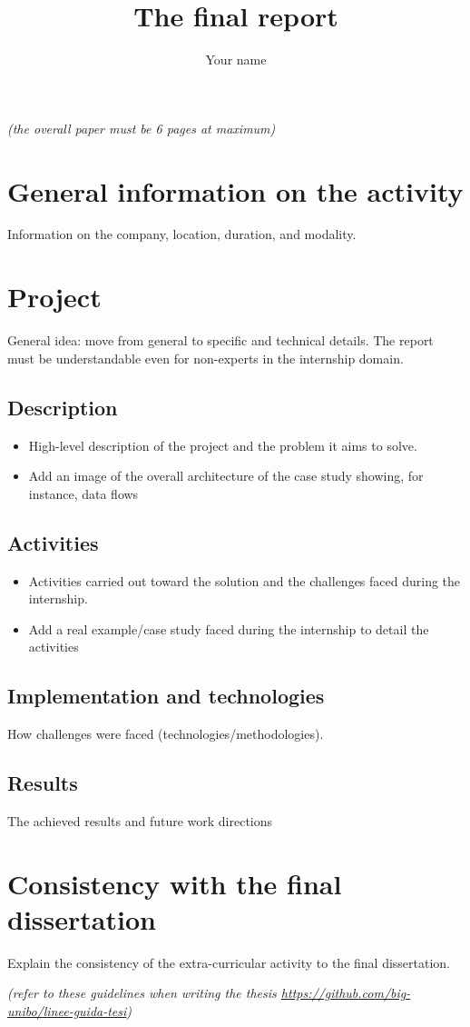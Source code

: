 \documentclass{article}
\title{The final report}
\author{Your name}
\begin{document}
\maketitle

\textit{(the overall paper must be 6 pages at maximum)}

\section{General information on the activity}
Information on the company, location, duration, and modality.

\section{Project}
General idea: move from general to specific and technical details.
The report must be understandable even for non-experts in the internship domain.

\subsection{Description}
\begin{itemize}
    \item High-level description of the project and the problem it aims to solve.
    \item Add an image of the overall architecture of the case study showing, for instance, data flows
\end{itemize}

\subsection{Activities}
\begin{itemize}
    \item Activities carried out toward the solution and the challenges faced during the internship.
    \item Add a real example/case study faced during the internship to detail the activities
\end{itemize}

\subsection{Implementation and technologies}
How challenges were faced (technologies/methodologies).

\subsection{Results}
The achieved results and future work directions

\section{Consistency with the final dissertation}
Explain the consistency of the extra-curricular activity to the final dissertation. 

\textit{(refer to these guidelines when writing the thesis \url{https://github.com/big-unibo/linee-guida-tesi})}
\end{document}
